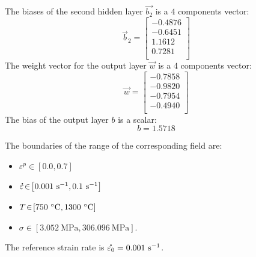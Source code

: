 \documentclass[algorithms,article,submit,pdftex,moreauthors]{Definitions/mdpi}
\DeclareRobustCommand{\mdot}[1]{\accentset{\mbox{\bfseries .}}{#1}}
\DeclareRobustCommand{\ps}{\text{s}^{-1}}
\DeclareRobustCommand{\MPa}{\text{MPa}}
\begin{document}
The biases of the second hidden layer $\overrightarrow{b_2}$ is a $4$ components vector:
\begin{equation*}
\overrightarrow{b}_2 = \left[
\begin{array}{r}
-0.4876\\
-0.6451\\
1.1612\\
0.7281\\
\end{array}\right]
\end{equation*}
The weight vector for the output layer $\overrightarrow{w}$ is a $4$ components vector:
\begin{equation*}
\overrightarrow{w} = \left[
\begin{array}{r}
-0.7858\\
-0.9820\\
-0.7954\\
-0.4940\\
\end{array}\right]
\end{equation*}
The bias of the output layer $b$ is a scalar:
\begin{equation*}
b =1.5718
\end{equation*}

The boundaries of the range of the corresponding field are:
\begin{itemize}
\item $\varepsilon^p\!\in\!\left[0.0,0.7\right]$
\item $\mdot{\varepsilon}\!\in\!\left[0.001~\ps,0.1~\ps\right]$
\item $T\!\in\!\left[750~\celsius,1300~\celsius\right]$
\item $\sigma\!\in\!\left[3.052~\MPa,306.096~\MPa\right]$.
\end{itemize}
The reference strain rate is $\mdot{\varepsilon_0} = 0.001~\ps$.








%
\end{document}
